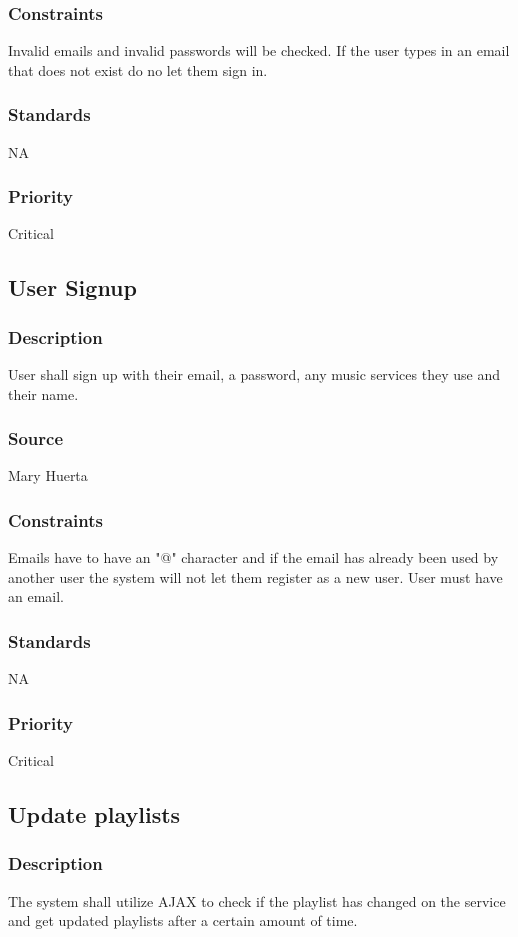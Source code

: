 \subsubsection{Constraints}
Invalid emails and invalid passwords will be checked. If the user types in an email that does not exist do no let them sign in.
\subsubsection{Standards}
NA
\subsubsection{Priority}
Critical


\subsection{User Signup}
\subsubsection{Description}
User shall sign up with their email, a password, any music services they use and their name.
\subsubsection{Source}
Mary Huerta
\subsubsection{Constraints}
Emails have to have an "@" character and if the email has already been used by another user the system will not let them register as a new user. User must have an email.
\subsubsection{Standards}
NA
\subsubsection{Priority}
Critical


\subsection{Update playlists}
\subsubsection{Description}
The system shall utilize AJAX to check if the playlist has changed on the service and get updated playlists after a certain amount of time.
